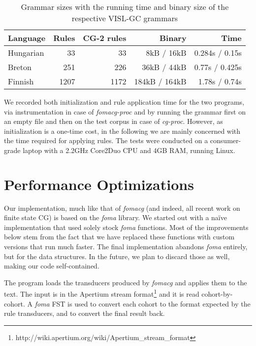 \documentclass[11pt]{article}
\begin{document}
\begin{table*}[h]
  \centering
  \caption{Grammar sizes with the running time and binary size of the respective
           VISL-GC grammars}
  \label{tab:grammar_size}
  \begin{tabular}{ | l | r | r | r | r | }
  \hline
  \textbf{Language} & \textbf{Rules} & \textbf{CG-2 rules} &
  \textbf{Binary} & \textbf{Time} \\
  \hline
  Hungarian &   33 &   33 &   8kB / 16kB & 0.284s / 0.15s \\
  Breton    &  251 &  226 &  36kB / 44kB & 0.77s / 0.425s \\
  Finnish   & 1207 & 1172 & 184kB / 164kB & 1.78s / 0.74s \\
  \hline
  \end{tabular}
\end{table*}

We recorded both initialization and rule application time for the two programs,
via instrumentation in case of \emph{fomacg-proc} and by running the grammar
first on an empty file and then on the test corpus in case of \emph{cg-proc}.
However, as initialization is a one-time cost, in the following we are mainly
concerned with the time required for applying rules. The tests were conducted on
a consumer-grade laptop with a 2.2GHz Core2Duo CPU and 4GB RAM, running Linux.

\section{Performance Optimizations}
\label{sec:speed}

Our implementation, much like that of \emph{fomacg} (and indeed, all recent
work on finite state CG) is based on the \emph{foma} library. We started out
with a naïve implementation that used solely stock \emph{foma} functions. Most
of the improvements below stem from the fact that we have replaced these
functions with custom versions that run much faster. The final implementation
abandons \emph{foma} entirely, but for the data structures. In the future, we
plan to discard those as well, making our code self-contained.

The program loads the transducers produced by \emph{fomacg} and applies them
to the text. The input is in the Apertium stream
format\footnote{http://wiki.apertium.org/wiki/Apertium\_stream\_format}
and it is read cohort-by-cohort. A \emph{foma} FST is used to convert each
cohort to the format expected by the rule transducers, and to convert the final
result back.
\end{document}

